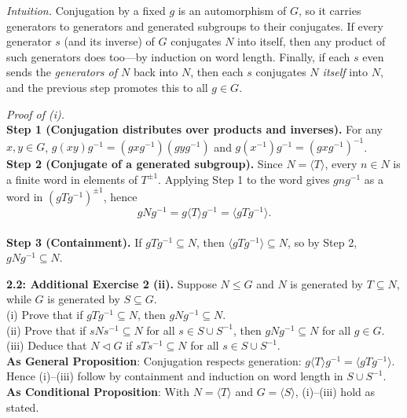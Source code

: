 \documentclass[12pt]{article}
\theoremstyle{definition}
\begin{document}
\newpage

\dotfill

\emph{Intuition.} Conjugation by a fixed $g$ is an automorphism of $G$, so it carries generators to generators and generated subgroups to their conjugates. If every generator $s$ (and its inverse) of $G$ conjugates $N$ into itself, then any product of such generators does too—by induction on word length. Finally, if each $s$ even sends the \emph{generators of $N$} back into $N$, then each $s$ conjugates \emph{$N$ itself} into $N$, and the previous step promotes this to all $g\in G$.\\

\dotfill

\emph{Proof of (i).}\\
\textbf{Step 1 (Conjugation distributes over products and inverses).} For any $x,y\in G$, $g(xy)g^{-1}=(gxg^{-1})(gyg^{-1})$ and $g(x^{-1})g^{-1}=(gxg^{-1})^{-1}$.\\
\textbf{Step 2 (Conjugate of a generated subgroup).} Since $N=\langle T\rangle$, every $n\in N$ is a finite word in elements of $T^{\pm1}$. Applying Step 1 to the word gives $gng^{-1}$ as a word in $(gTg^{-1})^{\pm1}$, hence
\[
gNg^{-1}=g\langle T\rangle g^{-1}=\langle gTg^{-1}\rangle.
\] \\
\textbf{Step 3 (Containment).} If $gTg^{-1}\subseteq N$, then $\langle gTg^{-1}\rangle\subseteq N$, so by Step 2, $gNg^{-1}\subseteq N$.

\newpage

\noindent \textbf{2.2: Additional Exercise 2 (ii).} 
Suppose $N\le G$ and $N$ is generated by $T\subseteq N$, while $G$ is generated by $S\subseteq G$.\\
(i) Prove that if $gTg^{-1}\subseteq N$, then $gNg^{-1}\subseteq N$.\\
(ii) Prove that if $sNs^{-1}\subseteq N$ for all $s\in S\cup S^{-1}$, then $gNg^{-1}\subseteq N$ for all $g\in G$.\\
(iii) Deduce that $N\lhd G$ if $sTs^{-1}\subseteq N$ for all $s\in S\cup S^{-1}$.\\ %

\noindent\textbf{As General Proposition}: Conjugation respects generation: $g\langle T\rangle g^{-1}=\langle gTg^{-1}\rangle$. Hence (i)–(iii) follow by containment and induction on word length in $S\cup S^{-1}$.\\

\noindent \textbf{As Conditional Proposition}: With $N=\langle T\rangle$ and $G=\langle S\rangle$, (i)–(iii) hold as stated.
\end{document}
